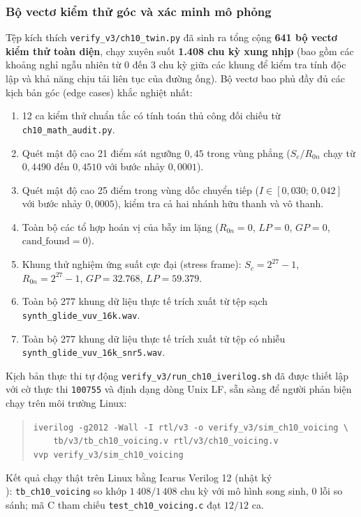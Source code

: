 \subsubsection*{Bộ vectơ kiểm thử góc và xác minh mô phỏng}
Tệp kích thích \texttt{verify\_v3/ch10\_twin.py} đã sinh ra tổng cộng \textbf{641 bộ vectơ kiểm thử toàn diện}, chạy xuyên suốt \textbf{1.408 chu kỳ xung nhịp} (bao gồm các khoảng nghỉ ngẫu nhiên từ 0 đến 3 chu kỳ giữa các khung để kiểm tra tính độc lập và khả năng chịu tải liên tục của đường ống). Bộ vectơ bao phủ đầy đủ các kịch bản góc (edge cases) khắc nghiệt nhất:
\begin{enumerate}
    \item 12 ca kiểm thử chuẩn tắc có tính toán thủ công đối chiếu từ \texttt{ch10\_math\_audit.py}.
    \item Quét mật độ cao 21 điểm sát ngưỡng $0{,}45$ trong vùng phẳng ($S_c / R_{0n}$ chạy từ $0{,}4490$ đến $0{,}4510$ với bước nhảy $0{,}0001$).
    \item Quét mật độ cao 25 điểm trong vùng dốc chuyển tiếp ($I \in [0{,}030;\, 0{,}042]$ với bước nhảy $0{,}0005$), kiểm tra cả hai nhánh hữu thanh và vô thanh.
    \item Toàn bộ các tổ hợp hoán vị của bẫy im lặng ($R_{0n}=0$, $LP=0$, $GP=0$, $\text{cand\_found}=0$).
    \item Khung thử nghiệm ứng suất cực đại (stress frame): $S_c = 2^{27}-1$, $R_{0n} = 2^{27}-1$, $GP = 32.768$, $LP = 59.379$.
    \item Toàn bộ 277 khung dữ liệu thực tế trích xuất từ tệp sạch \texttt{synth\_glide\_vuv\_16k.wav}.
    \item Toàn bộ 277 khung dữ liệu thực tế trích xuất từ tệp có nhiễu \texttt{synth\_glide\_vuv\_16k\_snr5.wav}.
\end{enumerate}

Kịch bản thực thi tự động \texttt{verify\_v3/run\_ch10\_iverilog.sh} đã được thiết lập với cờ thực thi \texttt{100755} và định dạng dòng Unix LF, sẵn sàng để người phản biện chạy trên môi trường Linux:
\begin{quote}
\footnotesize
\texttt{iverilog -g2012 -Wall -I rtl/v3 -o verify\_v3/sim\_ch10\_voicing \textbackslash}\\
\texttt{\ \ \ \ tb/v3/tb\_ch10\_voicing.v rtl/v3/ch10\_voicing.v}\\
\texttt{vvp verify\_v3/sim\_ch10\_voicing}
\end{quote}

Kết quả chạy thật trên Linux bằng Icarus Verilog 12 (nhật ký\\ ): \texttt{tb\_ch10\_voicing} so khớp $1\,408/1\,408$ chu kỳ với mô hình song sinh, 0 lỗi so sánh; mã C tham chiếu \texttt{test\_ch10\_voicing.c} đạt $12/12$ ca.


